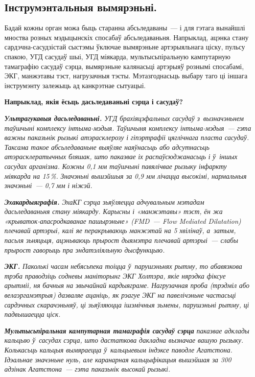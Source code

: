 \subsection*{Інструмэнтальныя вымярэньні.}

Бадай кожны орган можа быць старанна абсьледаваны~--- і для гэтага вынайшлі мноства розных мэдыцынскіх спосабаў абсьледаваньня. Напрыклад, ацэнка стану сардэчна-сасудзістай сыстэмы ўключае вымярэньне артэрыяльнага ціску, пульсу спакою, УГД сасудаў шыі, УГД міякарда, мультысьпіральную кампутарную тамаграфію сасудаў сэрца, вымярэньне калянасьці артэрыяў рознымі спосабамі, ЭКГ, манжэтавы тэст, нагрузачныя тэсты. Мэтазгоднасьць выбару таго ці іншага інструмэнту залежыць ад канкрэтнае сытуацыі.

\textbf{Напрыклад, якія ёсьць дасьледаваньні сэрца і сасудаў?}

\emph{\textbf{Ультрагукавыя дасьледаваньні.} УГД брахіяцэфальных сасудаў з~вызначэньнем таўшчыні комплексу інтыма-мэдыя. Таўшчыня комплексу інтыма-мэдыя~--- гэта важны паказьнік рызыкі атэрасклерозу і гіпэртрафіі цяглічнага пласта сасудаў. Таксама такое абсьледаваньне выяўляе наяўнасьць або адсутнасьць атэрасклератычных бляшак, што паказвае іх распаўсюджанасьць і ў~іншых сасудах арганізма. Кожны 0,1 мм таўшчыні павялічвае рызыку інфаркту міякарда на 15\,\%. Значэньні вышэйшыя за 0,9 мм лічацца высокімі, нармальныя значэньні~--- 0,7 мм і ніжэй.}

\emph{\textbf{Эхакардыяграфія.} ЭхаКГ сэрца зьяўляецца адчувальным мэтадам дасьледаваньня стану міякарду. Карысны і «манжэтавы» тэст, ён жа «крываток-апасродкаванае пашырэньне» (FMD~--- Flow Mediated Dilatation) плечавай артэрыі, калі яе перакрываюць манжэтай на 5 хвілінаў, а~затым, пасьля зьняцьця, ацэньваюць прырост дыямэтра плечавай артэрыі~--- слабы прырост гаворыць пра эндатэліяльную дысфункцыю.}

\emph{\textbf{ЭКГ.} Паколькі часам небясьпека тоіцца ў~парушэньнях рытму, то абавязкова трэба праводзіць содневы маніторынг ЭКГ Холтэра, якіе нярэдка фіксуе арытміі, ня бачныя на звычайнай кардыяграме. Нагрузачная проба (трэдміл або велаэргамэтрыя) дазваляе ацаніць, як рэагуе ЭКГ на павелічэньне частасьці сардэчных скарачэньняў, ці зьяўляюцца ішэмічныя зьмены, парушэньні рытму, ці падвышаецца ціск.}


\emph{\textbf{Мультысьпіральная кампутарная тамаграфія сасудаў сэрца} паказвае адклады кальцыю ў~сасудах сэрца, што дастаткова дакладна вызначае вашую рызыку. Колькасьць кальцыя вымяраецца ў~кальцыевым індэксе паводле Агатстона. Ідэальнае значэньне нуль, але каранарная кальцыфікацыя вышэйшая за 300 адзінак Агатстона~--- гэта паказьнік высокай рызыкі.}


